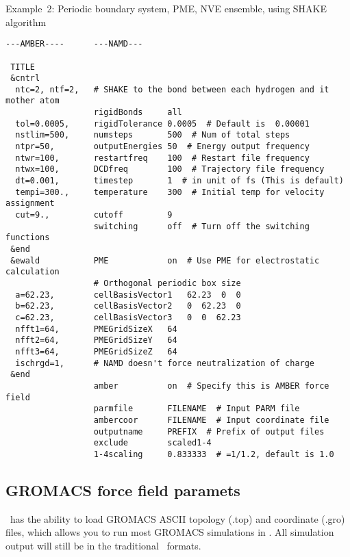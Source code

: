 \noindent Example~2: Periodic boundary system, PME, NVE ensemble,
using SHAKE algorithm

\begin{verbatim}
---AMBER----      ---NAMD---

 TITLE
 &cntrl
  ntc=2, ntf=2,   # SHAKE to the bond between each hydrogen and it mother atom
                  rigidBonds     all
  tol=0.0005,     rigidTolerance 0.0005  # Default is  0.00001
  nstlim=500,     numsteps       500  # Num of total steps
  ntpr=50,        outputEnergies 50  # Energy output frequency
  ntwr=100,       restartfreq    100  # Restart file frequency
  ntwx=100,       DCDfreq        100  # Trajectory file frequency
  dt=0.001,       timestep       1  # in unit of fs (This is default)
  tempi=300.,     temperature    300  # Initial temp for velocity assignment
  cut=9.,         cutoff         9
                  switching      off  # Turn off the switching functions
 &end
 &ewald           PME            on  # Use PME for electrostatic calculation
                  # Orthogonal periodic box size
  a=62.23,        cellBasisVector1   62.23  0  0
  b=62.23,        cellBasisVector2   0  62.23  0
  c=62.23,        cellBasisVector3   0  0  62.23
  nfft1=64,       PMEGridSizeX   64
  nfft2=64,       PMEGridSizeY   64
  nfft3=64,       PMEGridSizeZ   64
  ischrgd=1,      # NAMD doesn't force neutralization of charge
 &end
                  amber          on  # Specify this is AMBER force field
                  parmfile       FILENAME  # Input PARM file
                  ambercoor      FILENAME  # Input coordinate file
                  outputname     PREFIX  # Prefix of output files
                  exclude        scaled1-4
                  1-4scaling     0.833333  # =1/1.2, default is 1.0
\end{verbatim}

\subsection{GROMACS force field paramets}

\NAMD\ has the ability to load GROMACS ASCII topology (.top) and
coordinate (.gro) files, which allows you to run most GROMACS
simulations in \NAMD.  All simulation output will still be in the
traditional \NAMD\ formats.

